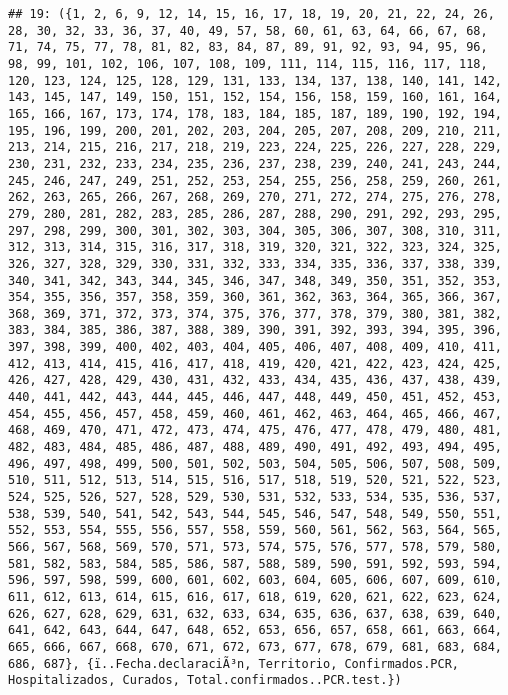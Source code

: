 \documentclass[
]{book}
\begin{document}
\begin{verbatim}
## 19: ({1, 2, 6, 9, 12, 14, 15, 16, 17, 18, 19, 20, 21, 22, 24, 26, 28, 30, 32, 33, 36, 37, 40, 49, 57, 58, 60, 61, 63, 64, 66, 67, 68, 71, 74, 75, 77, 78, 81, 82, 83, 84, 87, 89, 91, 92, 93, 94, 95, 96, 98, 99, 101, 102, 106, 107, 108, 109, 111, 114, 115, 116, 117, 118, 120, 123, 124, 125, 128, 129, 131, 133, 134, 137, 138, 140, 141, 142, 143, 145, 147, 149, 150, 151, 152, 154, 156, 158, 159, 160, 161, 164, 165, 166, 167, 173, 174, 178, 183, 184, 185, 187, 189, 190, 192, 194, 195, 196, 199, 200, 201, 202, 203, 204, 205, 207, 208, 209, 210, 211, 213, 214, 215, 216, 217, 218, 219, 223, 224, 225, 226, 227, 228, 229, 230, 231, 232, 233, 234, 235, 236, 237, 238, 239, 240, 241, 243, 244, 245, 246, 247, 249, 251, 252, 253, 254, 255, 256, 258, 259, 260, 261, 262, 263, 265, 266, 267, 268, 269, 270, 271, 272, 274, 275, 276, 278, 279, 280, 281, 282, 283, 285, 286, 287, 288, 290, 291, 292, 293, 295, 297, 298, 299, 300, 301, 302, 303, 304, 305, 306, 307, 308, 310, 311, 312, 313, 314, 315, 316, 317, 318, 319, 320, 321, 322, 323, 324, 325, 326, 327, 328, 329, 330, 331, 332, 333, 334, 335, 336, 337, 338, 339, 340, 341, 342, 343, 344, 345, 346, 347, 348, 349, 350, 351, 352, 353, 354, 355, 356, 357, 358, 359, 360, 361, 362, 363, 364, 365, 366, 367, 368, 369, 371, 372, 373, 374, 375, 376, 377, 378, 379, 380, 381, 382, 383, 384, 385, 386, 387, 388, 389, 390, 391, 392, 393, 394, 395, 396, 397, 398, 399, 400, 402, 403, 404, 405, 406, 407, 408, 409, 410, 411, 412, 413, 414, 415, 416, 417, 418, 419, 420, 421, 422, 423, 424, 425, 426, 427, 428, 429, 430, 431, 432, 433, 434, 435, 436, 437, 438, 439, 440, 441, 442, 443, 444, 445, 446, 447, 448, 449, 450, 451, 452, 453, 454, 455, 456, 457, 458, 459, 460, 461, 462, 463, 464, 465, 466, 467, 468, 469, 470, 471, 472, 473, 474, 475, 476, 477, 478, 479, 480, 481, 482, 483, 484, 485, 486, 487, 488, 489, 490, 491, 492, 493, 494, 495, 496, 497, 498, 499, 500, 501, 502, 503, 504, 505, 506, 507, 508, 509, 510, 511, 512, 513, 514, 515, 516, 517, 518, 519, 520, 521, 522, 523, 524, 525, 526, 527, 528, 529, 530, 531, 532, 533, 534, 535, 536, 537, 538, 539, 540, 541, 542, 543, 544, 545, 546, 547, 548, 549, 550, 551, 552, 553, 554, 555, 556, 557, 558, 559, 560, 561, 562, 563, 564, 565, 566, 567, 568, 569, 570, 571, 573, 574, 575, 576, 577, 578, 579, 580, 581, 582, 583, 584, 585, 586, 587, 588, 589, 590, 591, 592, 593, 594, 596, 597, 598, 599, 600, 601, 602, 603, 604, 605, 606, 607, 609, 610, 611, 612, 613, 614, 615, 616, 617, 618, 619, 620, 621, 622, 623, 624, 626, 627, 628, 629, 631, 632, 633, 634, 635, 636, 637, 638, 639, 640, 641, 642, 643, 644, 647, 648, 652, 653, 656, 657, 658, 661, 663, 664, 665, 666, 667, 668, 670, 671, 672, 673, 677, 678, 679, 681, 683, 684, 686, 687}, {ï..Fecha.declaraciÃ³n, Territorio, Confirmados.PCR, Hospitalizados, Curados, Total.confirmados..PCR.test.})

\end{verbatim}
\end{document}

